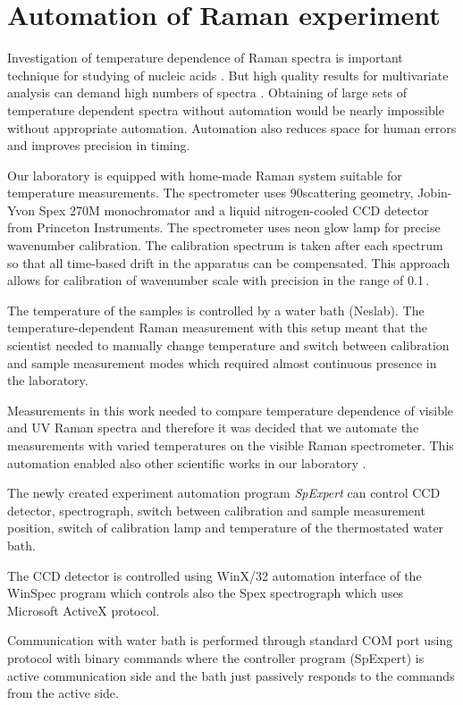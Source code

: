 \section{Automation of Raman experiment}

Investigation of temperature dependence of Raman spectra is important technique
for studying of nucleic acids
\parencite{Klener2021}.
But high quality results for multivariate analysis can demand high numbers of
spectra
\parencite{Palacky2020}.
Obtaining of large sets of temperature dependent spectra without automation
would be nearly impossible without appropriate automation.
Automation also reduces space for human errors and improves precision in
timing.

Our laboratory is equipped with home-made Raman system suitable for
temperature measurements.
The spectrometer uses 90\textdegree scattering geometry, Jobin-Yvon Spex 270M
monochromator and a liquid nitrogen-cooled CCD detector from Princeton
Instruments.
The spectrometer uses neon glow lamp for precise wavenumber calibration.
The calibration spectrum is taken after each spectrum so that all time-based
drift in the apparatus can be compensated.
This approach allows for calibration of wavenumber scale with precision in the
range of 0.1\,\icm{}.

The temperature of the samples is controlled by a water bath (Neslab). The
temperature-dependent Raman measurement with this setup meant that the
scientist needed to manually change temperature and switch between calibration
and sample measurement modes which required almost continuous presence
in the laboratory.

Measurements in this work needed to compare temperature dependence of visible
and UV Raman spectra
\parencite{Klener2021}
and therefore it was decided that we automate the measurements with varied
temperatures on the visible Raman spectrometer.
This automation enabled also other scientific works in our laboratory
\parencite{%
	Mudronova2016,%
	Bravo2018,%
	Palacky2020%
}.

The newly created experiment automation program \emph{SpExpert} can control
CCD detector, spectrograph, switch between calibration and sample measurement
position, switch of calibration lamp and temperature of the thermostated
water bath.

The CCD detector is controlled using WinX/32 automation interface of the
WinSpec program which controls also the Spex spectrograph which uses Microsoft
ActiveX protocol.

Communication with water bath is performed through standard COM port using
protocol with binary commands where the controller program (SpExpert) is
active communication side and the bath just passively responds to the
commands from the active side.

